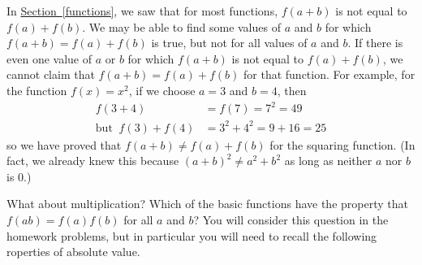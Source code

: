 \documentclass[10pt,]{book}
\theoremstyle{plain}
\theoremstyle{definition}
\theoremstyle{definition}
\numberwithin{equation}{section}
\newcommand{\amp}{ & }
\begin{document}
    In \hyperref[functions]{Section~\ref{functions}}, we saw that for most functions, \(f (a + b)\) is not equal to \(f (a) + f (b)\). We may be able to find some values of \(a\) and \(b\) for which \(f (a + b) = f (a) + f (b)\) is true, but not for all values of \(a\) and \(b\). If there is even one value of \(a\) or \(b\) for which \(f (a + b)\) is not equal to \(f (a) + f (b)\), we cannot claim that \(f (a + b) = f (a) + f (b)\) for that function. For example, for the function \(f (x) = x^2\), if we choose \(a = 3\) and \(b = 4\), then
    \begin{align*}
f (3 + 4) \amp = f (7) = 7^2 = 49\\
\text{but }~ f (3) + f (4) \amp = 3^2 + 4^2 = 9 + 16 = 25
\end{align*}
    so we have proved that \(f (a + b) \ne f (a) + f (b)\) for the squaring function. (In fact, we already knew this because \((a + b)^2 \ne a^2 + b^2\) as long as neither \(a\) nor \(b\) is \(0\).)
%
\par

    What about multiplication? Which of the basic functions have the property that \(f (ab) = f (a) f (b)\) for all \(a\) and \(b\)? You will consider this question in the homework problems, but in particular you will need to recall the following  roperties of absolute
value.
%
\typeout{************************************************}
\typeout{************************************************}
\end{document}
